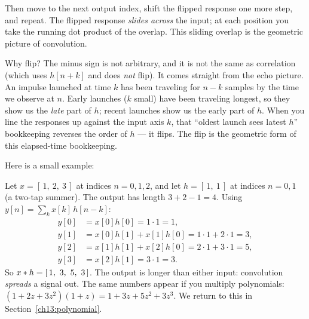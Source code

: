 Then move to the next output index, shift the flipped response one more step,
and repeat. The flipped response \emph{slides across} the input; at each
position you take the running dot product of the overlap. This sliding overlap is
the geometric picture of convolution.

\begin{whybox}
Why flip? The minus sign is not arbitrary, and it is not the same as
correlation (which uses $h[n+k]$ and does \emph{not} flip). It comes straight
from the echo picture. An impulse launched at time $k$ has been traveling for
$n-k$ samples by the time we observe at $n$. Early launches ($k$ small) have
been traveling longest, so they show us the \emph{late} part of $h$; recent
launches show us the early part of $h$. When you line the responses up against
the input axis $k$, that ``oldest launch sees latest $h$'' bookkeeping reverses
the order of $h$ --- it flips. The flip is the geometric form of this
elapsed-time bookkeeping.
\end{whybox}

Here is a small example:

\begin{example}
\label{ch13:ex-byhand}
Let $x = [\,1,\ 2,\ 3\,]$ at indices $n=0,1,2$, and let
$h = [\,1,\ 1\,]$ at indices $n=0,1$ (a two-tap summer). The output has length
$3+2-1 = 4$. Using $y[n] = \sum_k x[k]\,h[n-k]$:
\begin{align*}
y[0] &= x[0]h[0] = 1\cdot 1 = 1, \\
y[1] &= x[0]h[1] + x[1]h[0] = 1\cdot 1 + 2\cdot 1 = 3, \\
y[2] &= x[1]h[1] + x[2]h[0] = 2\cdot 1 + 3\cdot 1 = 5, \\
y[3] &= x[2]h[1] = 3\cdot 1 = 3.
\end{align*}
So $x \ast h = [\,1,\ 3,\ 5,\ 3\,]$. The output is longer than either input: convolution \emph{spreads} a signal out. The same numbers appear if you multiply polynomials: $(1 + 2z + 3z^2) (1 + z) = 1 + 3z + 5z^2 + 3z^3$. We return to this in Section~\ref{ch13:polynomial}.
\end{example}

